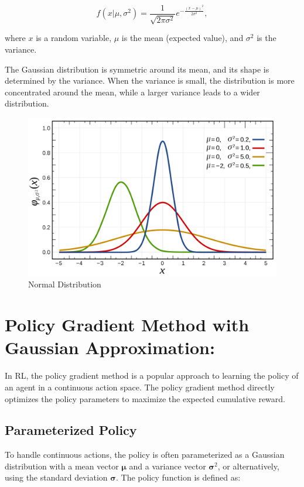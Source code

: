 \begin{equation}
    f(x | \mu, \sigma^2) = \frac{1}{\sqrt{2\pi\sigma^2}} e^{-\frac{(x-\mu)^2}{2\sigma^2}},\label{eq:equation}
\end{equation}

where $x$ is a random variable, $\mu$ is the mean (expected value), and $\sigma^2$ is the variance.

The Gaussian distribution is symmetric around its mean, and its shape is determined by the variance. When the variance is small, the distribution is more concentrated around the mean, while a larger variance leads to a wider distribution.
\begin{figure}[!h]
    \centering
    \includegraphics[width=12cm]{assets/normal}
    \caption{Normal Distribution}\label{fig:figure}
\end{figure}

\section{Policy Gradient Method with Gaussian Approximation:}\label{sec:policy-gradient-method-with-gaussian-approximation:}
In RL, the policy gradient method is a popular approach to learning the policy of an agent in a continuous action space.
The policy gradient method directly optimizes the policy parameters to maximize the expected cumulative reward.

\subsection{Parameterized Policy}\label{subsec:parameterized-policy}
To handle continuous actions, the policy is often parameterized as a Gaussian distribution with a mean vector $\boldsymbol{\mu}$ and a variance vector $\boldsymbol{\sigma}^2$, or alternatively, using the standard deviation $\boldsymbol{\sigma}$. The policy function is defined as:

